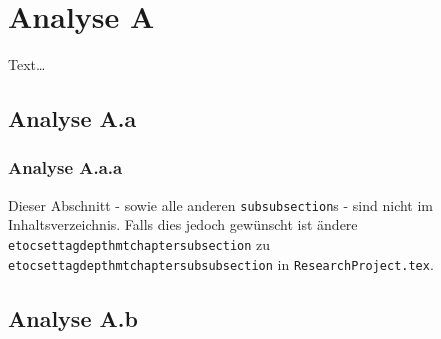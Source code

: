 \section{Analyse A}
\label{sec:analyseA}

Text\dots

\subsection{Analyse A.a}
\label{sec:analyseAa}

\subsubsection{Analyse A.a.a}
\label{sec:analyseAaa}

Dieser Abschnitt - sowie alle anderen \texttt{subsubsection}s - sind nicht im Inhaltsverzeichnis. Falls dies jedoch gewünscht ist ändere \texttt{etocsettagdepth{mtchapter}{subsection}} zu \texttt{etocsettagdepth{mtchapter}{subsubsection}} in \texttt{ResearchProject.tex}.

\subsection{Analyse A.b}
\label{sec:analyseAb}
